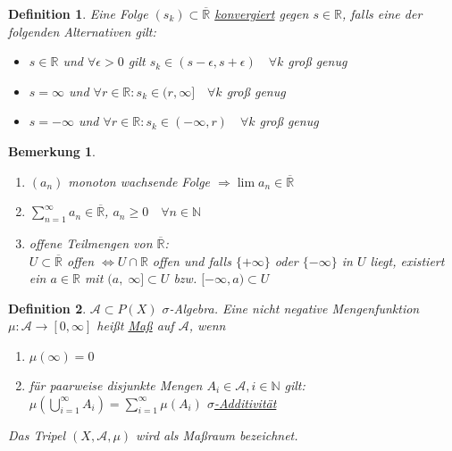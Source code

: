 \documentclass[11pt]{memoir}
\theoremstyle{changebreak}
\newtheorem{Definition}{Definition}[chapter]
\newtheorem{Bemerkung}{Bemerkung}[chapter]
\begin{document}
\begin{Definition}
Eine Folge $(s_{k}) \subset \overline{\mathbb{R}}$ \underline{konvergiert} gegen $s \in \mathbb{R}$, falls eine der folgenden Alternativen gilt:
\begin{itemize}
	\item  $s \in \mathbb{R}$ und $\forall \epsilon > 0$ gilt $s_{k} \in (s-\epsilon, s+\epsilon) \quad\forall k$ groß genug
	\item $s = \infty$ und $\forall r \in \mathbb{R}: s_{k} \in (r, \infty] \quad \forall k$ groß genug
	\item $s = -\infty$ und $\forall r \in \mathbb{R}: s_k \in (-\infty, r) \quad \forall k$ groß genug
\end{itemize}
\end{Definition}

\begin{Bemerkung}
\begin{enumerate}
	\item $(a_n)$ monoton wachsende Folge
	$\Rightarrow \lim a_n \in \mathbb{\overline{R}}$
	\item $\sum\limits_{n=1}^{\infty} a_n \in \mathbb{\overline{R}}$, $a_n \geq 0 \quad \forall n \in \mathbb{N}$
	\item offene Teilmengen von $\overline{\mathbb{R}}$: \\
	$U \subset \overline{\mathbb{R}} $ offen $\Leftrightarrow U \cap \mathbb{R}$ offen und falls $\{+\infty\}$ oder $\{-\infty\}$ in $U$ liegt, existiert ein $a \in \mathbb{R}$ mit $(a,\; \infty ]\subset U$ bzw. $[-\infty, a) \subset U$
\end{enumerate}
\end{Bemerkung}

\begin{Definition}
$\mathscr{A} \subset P(X)$ $\sigma$-Algebra. Eine nicht negative Mengenfunktion $\mu: \mathscr{A} \rightarrow [0, \infty]$ heißt \underline{Maß} auf $\mathscr{A}$, wenn
\begin{enumerate}
	\item $\mu(\infty) = 0$
	\item für paarweise disjunkte Mengen $A_i \in \mathscr{A}, i \in \mathbb{N}$ gilt: \\
	$\mu(\bigcup\limits_{i=1}^{\infty}A_i) = \sum\limits_{i=1}^{\infty} \mu(A_i)$ \underline{$\sigma$-Additivität}
\end{enumerate}
Das Tripel $(X, \mathscr{A}, \mu)$ wird als Maßraum bezeichnet.
\end{Definition}
\end{document}
